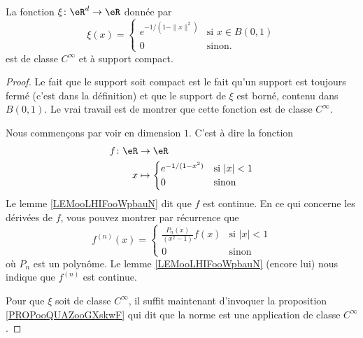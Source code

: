 \begin{proposition}     \label{PROPooAHLKooMFMgFq}
	La fonction \( \xi\colon \eR^d\to \eR\) donnée par
	\begin{equation}    \label{EqOBYNEMu}
		\xi(x)=\begin{cases}
			e^{-1/(1-\| x \|^2)} & \text{si } x\in B(0,1) \\
			0                    & \text{sinon}.
		\end{cases}
	\end{equation}
	est de classe \( C^{\infty}\) et à support compact.
\end{proposition}

\begin{proof}
	Le fait que le support soit compact est le fait qu'un support est toujours fermé (c'est dans la définition) et que le support de \( \xi\) est borné, contenu dans \( B(0,1)\). Le vrai travail est de montrer que cette fonction est de classe \(  C^{\infty}\).

	Nous commençons par voir en dimension \( 1\). C'est à dire la fonction
	\begin{equation}
		\begin{aligned}
			f\colon \eR & \to \eR                                     \\
			x           & \mapsto \begin{cases}
				                      e^{-1/(1-x^2)} & \text{si } | x |<1 \\
				                      0              & \text{sinon }
			                      \end{cases}
		\end{aligned}
	\end{equation}
	Le lemme \ref{LEMooLHIFooWpbauN} dit que \( f\) est continue. En ce qui concerne les dérivées de \( f\), vous pouvez montrer par récurrence que
	\begin{equation}
		f^{(n)}(x)=\begin{cases}
			\frac{ P_n(x) }{ (x^2-1) }f(x) & \text{si } | x |<1 \\
			0                              & \text{sinon }
		\end{cases}
	\end{equation}
	où \( P_n\) est un polynôme. Le lemme \ref{LEMooLHIFooWpbauN} (encore lui) nous indique que \( f^{(n)}\) est continue.

	Pour que \( \xi\) soit de classe \(  C^{\infty}\), il suffit maintenant d'invoquer la proposition \ref{PROPooQUAZooGXskwF} qui dit que la norme est une application de classe \(  C^{\infty}\).
\end{proof}

